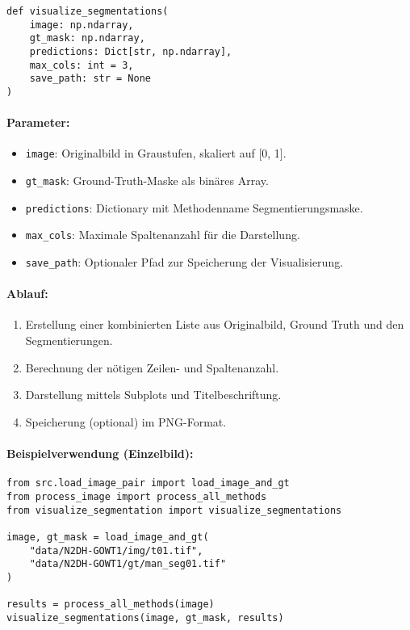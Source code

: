 \documentclass[a4paper,12pt]{article}
\begin{document}
\begin{verbatim}
def visualize_segmentations(
    image: np.ndarray,
    gt_mask: np.ndarray,
    predictions: Dict[str, np.ndarray],
    max_cols: int = 3,
    save_path: str = None
)
\end{verbatim}

\paragraph{Parameter:}
\begin{itemize}
    \item \texttt{image}: Originalbild in Graustufen, skaliert auf [0, 1].
    \item \texttt{gt\_mask}: Ground-Truth-Maske als binäres Array.
    \item \texttt{predictions}: Dictionary mit Methodenname \textrightarrow{} Segmentierungsmaske.
    \item \texttt{max\_cols}: Maximale Spaltenanzahl für die Darstellung.
    \item \texttt{save\_path}: Optionaler Pfad zur Speicherung der Visualisierung.
\end{itemize}

\paragraph{Ablauf:}
\begin{enumerate}
    \item Erstellung einer kombinierten Liste aus Originalbild, Ground Truth und den Segmentierungen.
    \item Berechnung der nötigen Zeilen- und Spaltenanzahl.
    \item Darstellung mittels Subplots und Titelbeschriftung.
    \item Speicherung (optional) im PNG-Format.
\end{enumerate}

\paragraph{Beispielverwendung (Einzelbild):}

\begin{verbatim}
from src.load_image_pair import load_image_and_gt
from process_image import process_all_methods
from visualize_segmentation import visualize_segmentations

image, gt_mask = load_image_and_gt(
    "data/N2DH-GOWT1/img/t01.tif",
    "data/N2DH-GOWT1/gt/man_seg01.tif"
)

results = process_all_methods(image)
visualize_segmentations(image, gt_mask, results)
\end{verbatim}
\end{document}
